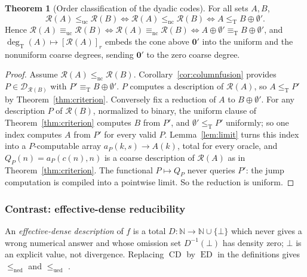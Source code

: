 \documentclass[11pt,letterpaper]{article}
\theoremstyle{definition}
\newtheorem{theorem}[definition]{Theorem}
\numberwithin{equation}{section}
\newcommand{\N}{\mathbb N}
\newcommand{\leT}{\le_{\mathrm T}}
\newcommand{\eqT}{\equiv_{\mathrm T}}
\newcommand{\lenc}{\le_{\mathrm{nc}}}
\newcommand{\leuc}{\le_{\mathrm{uc}}}
\newcommand{\eqnc}{\equiv_{\mathrm{nc}}}
\newcommand{\equc}{\equiv_{\mathrm{uc}}}
\newcommand{\ned}{\mathrm{ned}}
\newcommand{\ued}{\mathrm{ued}}
\newcommand{\CD}{\operatorname{CD}}
\newcommand{\ED}{\operatorname{ED}}
\newcommand{\DX}[1]{\mathcal D_{#1}}
\newcommand{\degT}{\deg_{\mathrm T}}
\newcommand{\Rc}{\mathcal R}
\newcommand{\zero}{\mathbf 0}
\newcommand{\src}[1]{\leavevmode{\sffamily\footnotesize\color{Steel}[#1]}}
\begin{document}
\begin{theorem}[Order classification of the dyadic codes]\label{thm:order}\src{R3}
For all sets $A,B$,
\[
 \Rc(A)\leuc\Rc(B)\iff\Rc(A)\lenc\Rc(B)\iff A\leT B\oplus\emptyset' .
\]
Hence $\Rc(A)\equc\Rc(B)\iff\Rc(A)\eqnc\Rc(B)\iff A\oplus\emptyset'\eqT B\oplus\emptyset'$, and $\degT(A)\mapsto[\Rc(A)]_r$ embeds the cone above $\zero'$ into the uniform and the nonuniform coarse degrees, sending $\zero'$ to the zero coarse degree.
\end{theorem}
\begin{proof}
Assume $\Rc(A)\lenc\Rc(B)$. Corollary~\ref{cor:columnfusion} provides $P\in\DX{\Rc(B)}$ with $P'\eqT B\oplus\emptyset'$. $P$ computes a description of $\Rc(A)$, so $A\leT P'$ by Theorem~\ref{thm:criterion}. Conversely fix a reduction of $A$ to $B\oplus\emptyset'$. For any description $P$ of $\Rc(B)$, normalized to binary, the uniform clause of Theorem~\ref{thm:criterion} computes $B$ from $P'$, and $\emptyset'\leT P'$ uniformly; so one index computes $A$ from $P'$ for every valid $P$. Lemma~\ref{lem:limit} turns this index into a $P$-computable array $a_P(k,s)\to A(k)$, total for every oracle, and $Q_P(n)=a_P(c(n),n)$ is a coarse description of $\Rc(A)$ as in Theorem~\ref{thm:criterion}. The functional $P\mapsto Q_P$ never queries $P'$: the jump computation is compiled into a pointwise limit. So the reduction is uniform.
\end{proof}

\subsubsection{Contrast: effective-dense reducibility}
An \emph{effective-dense description} of $f$ is a total $D:\N\to\N\cup\{\bot\}$ which never gives a wrong numerical answer and whose omission set $D^{-1}(\bot)$ has density zero; $\bot$ is an explicit value, not divergence. Replacing $\CD$ by $\ED$ in the definitions gives $\le_{\ned}$ and $\le_{\ued}$ \cite{Gerdes,AHJ}.
\end{document}
